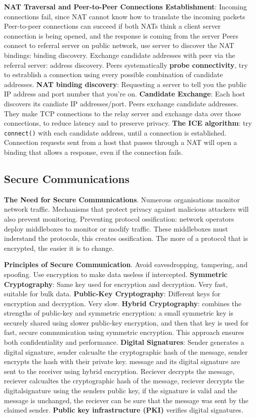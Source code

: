 \documentclass{article}
\begin{document}
\textbf{NAT Traversal and Peer-to-Peer Connections Establishment}:
Incoming connections fail, since NAT cannot know how to translate the incoming packets
Peer-to-peer connections can succeed if both NATs think a client server connection is being opened, and the response is coming from the server
Peers connect to referral server on public network, use server to discover the NAT bindings: binding discovery.
Exchange candidate addresses with peer via the referral server: address discovery.
Peers systematically \textbf{probe connectivity}, try to estrablish a connection using every possible combination of candidate addresses.
\textbf{NAT binding discovery}: Requesting a server to tell you the public IP address and port number that you're on.
\textbf{Candidate Exchange}: Each host discovers its candiate IP addresses/port. Peers exchange candidate addresses.
They make TCP connections to the relay server and exchange data over those connections, to reduce latency and to preserve privacy.
\textbf{The ICE algorithm}: try \texttt{connect()} with each candidate address, until a connection is established.
Connection requests sent from a host that passes through a NAT will open a binding that allows a response, even if the connection fails.


\subsection*{Secure Communications}

\textbf{The Need for Secure Communications}. Numerous organisations monitor network traffic.
Mechanisms that protect privacy against malicious attackers will also prevent monitoring.
Preventing protocol ossification: network operators deploy middleboxes to monitor or modify traffic.
These middleboxes must inderstand the protocols, this creates ossification.
The more of a protocol that is encrypted, the easier it is to change.

\textbf{Principles of Secure Communication}. Avoid eavesdropping, tampering, and spoofing.
Use encryption to make data useless if intercepted.
\textbf{Symmetric Cryptography}: Same key used for encryption and decryption. Very fast, suitable for bulk data.
\textbf{Public-Key Cryptography}: Different keys for encryption and decryption. Very slow.
\textbf{Hybrid Cryptography}: combines the strengths of public-key and symmetric encryption:
a small symmetric key is securely shared using slower public-key encryption,
and then that key is used for fast, secure communication using symmetric encryption.
This approach ensures both confidentiality and performance.
\textbf{Digital Signatures}: Sender generates a digital signature,
sender calcualte the cryptographic hash of the message,
sender encrypts the hash with their private key.
message and its digital signature are sent to the receiver using hybrid encryption.
Reciever decrypts the message,
reciever calcualtes the cryptographic hash of the message,
reciever decrypts the digitalsignature using the senders public key,
if the signature is valid and the message is unchanged, the reciever can be sure that the message was sent by the claimed sender.
\textbf{Public key infrastructure (PKI)} verifies digital signatures.
\end{document}
